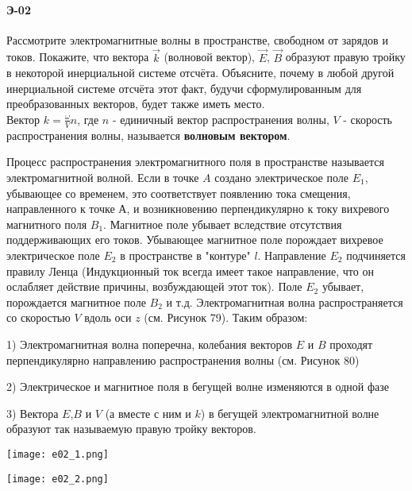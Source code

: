 \documentclass[__main__.tex]{subfiles}
\begin{document}
\paragraph{Э-02}

Рассмотрите электромагнитные волны в пространстве, свободном от зарядов и токов. Покажите, что вектора $\vec{k}$ (волновой вектор), $\vec{E}$, $\vec{B}$ образуют правую тройку в некоторой инерциальной системе отсчёта. Объясните, почему в любой другой инерциальной системе отсчёта этот факт, будучи сформулированным для преобразованных векторов, будет также иметь место.\\

Вектор $k = \frac{\omega}{V} n$, где $n$ - единичный вектор распространения волны, $V$ - скорость распространения волны, называется \textbf{волновым вектором}.

Процесс распространения электромагнитного поля в пространстве называется электромагнитной волной. Если в точке $A$ создано электрическое поле $E_1$, убывающее со временем, это соответствует появлению тока смещения, направленного к точке А, и возникновению перпендикулярно к току вихревого магнитного поля $B_1$. Магнитное поле убывает вследствие отсутствия поддерживающих его токов. Убывающее магнитное поле порождает вихревое электрическое поле $E_2$ в пространстве в "контуре" $l$. Направление $E_2$ подчиняется правилу Ленца (Индукционный ток всегда имеет такое направление, что он ослабляет действие причины, возбуждающей этот ток). Поле $E_2$ убывает, порождается магнитное поле $B_2$ и т.д. Электромагнитная волна распространяется со скоростью $V$ вдоль оси $z$ (см. Рисунок 79). Таким образом:

1) Электромагнитная волна поперечна, колебания векторов $E$ и $B$ проходят перпендикулярно направлению распространения волны (см. Рисунок 80)

2) Электрическое и магнитное поля в бегущей волне изменяются в одной фазе

3) Вектора $E$,$B$ и $V$ (а вместе с ним и $k$) в бегущей электромагнитной волне образуют так называемую правую тройку векторов.

\begin{center}
	\texttt{[image: e02\_1.png]}
\end{center}

\begin{center}
	\texttt{[image: e02\_2.png]}
\end{center}
\end{document}
